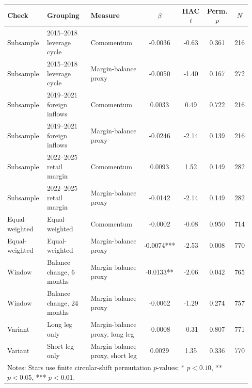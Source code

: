\begingroup\footnotesize\setlength{\tabcolsep}{2.5pt}
\begin{tabular}{lllcccc}
\toprule
Check & Grouping & Measure & $\beta$ & HAC $t$ & Perm. $p$ & $N$ \\
\midrule
Subsample & 2015--2018 leverage cycle & Comomentum & -0.0036 & -0.63 & 0.361 & 216 \\
Subsample & 2015--2018 leverage cycle & Margin-balance proxy & -0.0050 & -1.40 & 0.167 & 272 \\
Subsample & 2019--2021 foreign inflows & Comomentum & 0.0033 & 0.49 & 0.722 & 216 \\
Subsample & 2019--2021 foreign inflows & Margin-balance proxy & -0.0246 & -2.14 & 0.139 & 216 \\
Subsample & 2022--2025 retail margin & Comomentum & 0.0093 & 1.52 & 0.149 & 282 \\
Subsample & 2022--2025 retail margin & Margin-balance proxy & -0.0142 & -2.14 & 0.149 & 282 \\
Equal-weighted & Equal-weighted & Comomentum & -0.0002 & -0.08 & 0.950 & 714 \\
Equal-weighted & Equal-weighted & Margin-balance proxy & -0.0074*** & -2.53 & 0.008 & 770 \\
Window & Balance change, 6 months & Margin-balance proxy & -0.0133** & -2.06 & 0.042 & 765 \\
Window & Balance change, 24 months & Margin-balance proxy & -0.0062 & -1.29 & 0.274 & 757 \\
Variant & Long leg only & Margin-balance proxy, long leg & -0.0008 & -0.31 & 0.807 & 771 \\
Variant & Short leg only & Margin-balance proxy, short leg & 0.0029 & 1.35 & 0.336 & 770 \\
\midrule
\multicolumn{7}{l}{\parbox{\dimexpr\textwidth-10pt\relax}{\footnotesize Notes: Stars use finite circular-shift permutation $p$-values; * $p<0.10$, ** $p<0.05$, *** $p<0.01$.}} \\
\bottomrule
\end{tabular}

\endgroup